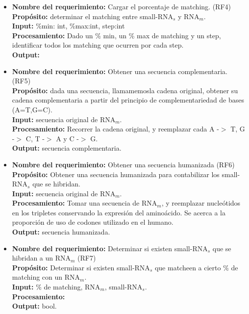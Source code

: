 \documentclass[12pt,a4paper,spanish]{article}
\begin{document}
\begin{itemize}
		\item \textbf{Nombre del requerimiento:} Cargar el porcentaje de matching. (RF4)\\								
 	    \textbf{Propósito:} determinar el matching entre small-RNA$_s$ y RNA$_m$. \\
		\textbf{Input:} \%min: int, \%max:int, step:int \\
		\textbf{Procesamiento:} Dado un \% min, un \% max de matching y un step, identificar todos los matching que ocurren por cada step.\\
		\textbf{Output:} \\

		\item \textbf{Nombre del requerimiento:} Obtener una secuencia complementaria. (RF5)\\
		\textbf{Propósito:} dada una secuencia, llamamemosla cadena original, obtener su cadena complementaria a partir del principio de 								complementariedad de bases (A=T,G=C).\\
		\textbf{Input:} secuencia original de RNA$_m$.\\
		\textbf{Procesamiento:} Recorrer la cadena original, y reemplazar cada A -$>$ T, G -$>$ C, T -$>$ A y C -$>$ G.\\
		\textbf{Output:} secuencia complementaria.\\

		\item \textbf{Nombre del requerimiento:} Obtener una secuencia humanizada (RF6)\\
 	    \textbf{Propósito:} Obtener una secuencia humanizada para contabilizar los small-RNA$_s$ que se hibridan. \\
		\textbf{Input:} secuencia original de RNA$_m$.\\
		\textbf{Procesamiento:} Tomar una secuencia de RNA$_m$, y reemplazar nucleótidos en los tripletes conservando la expresión del aminoácido. Se 									acerca a la proporción de uso de codones utilizado en el humano. \\
		\textbf{Output:} secuencia humanizada.\\

		\item \textbf{Nombre del requerimiento:} Determinar si existen small-RNA$_s$ que se hibridan a un RNA$_m$ (RF7)\\
 	    \textbf{Propósito:} Determinar si existen small-RNA$_s$ que matcheen a cierto \% de matching con un RNA$_m$.\\
		\textbf{Input:} \% de matching, RNA$_m$, small-RNA$_s$.\\
		\textbf{Procesamiento:} \\ %
		\textbf{Output:} bool. \\



\end{itemize}
\end{document}
